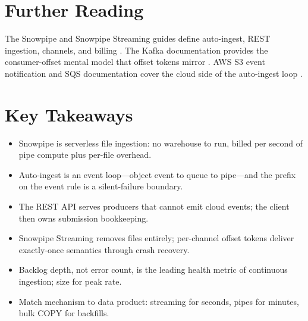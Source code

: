 \section{Further Reading}
The Snowpipe and Snowpipe Streaming guides define auto-ingest, REST ingestion, channels, and billing \cite{snowflakeSnowpipeDocs,snowflakeSnowpipeStreamingDocs}. The Kafka documentation provides the consumer-offset mental model that offset tokens mirror \cite{kafkaDocs}. AWS S3 event notification and SQS documentation cover the cloud side of the auto-ingest loop \cite{awsSqsDocs}.

\section*{Key Takeaways}
\begin{itemize}
    \item Snowpipe is serverless file ingestion: no warehouse to run, billed per second of pipe compute plus per-file overhead.
    \item Auto-ingest is an event loop---object event to queue to pipe---and the prefix on the event rule is a silent-failure boundary.
    \item The REST API serves producers that cannot emit cloud events; the client then owns submission bookkeeping.
    \item Snowpipe Streaming removes files entirely; per-channel offset tokens deliver exactly-once semantics through crash recovery.
    \item Backlog depth, not error count, is the leading health metric of continuous ingestion; size for peak rate.
    \item Match mechanism to data product: streaming for seconds, pipes for minutes, bulk COPY for backfills.
\end{itemize}

